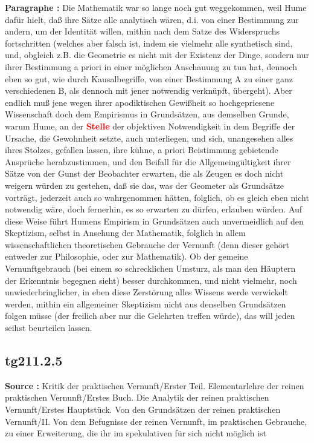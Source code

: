 \documentclass[a4paper,12pt,twoside]{book}
\newcommand{\match}[1]{\textcolor{red}{\textbf{#1}}}
\begin{document}
	\noindent\textbf{Paragraphe : }Die Mathematik war so lange noch gut weggekommen, weil Hume dafür hielt, daß ihre Sätze alle analytisch wären, d.i. von einer Bestimmung zur andern, um der Identität willen, mithin nach dem Satze des Widerspruchs fortschritten (welches aber falsch ist, indem sie vielmehr alle synthetisch sind, und, obgleich z.B. die Geometrie es nicht mit der Existenz der Dinge, sondern nur ihrer Bestimmung a priori in einer möglichen Anschauung zu tun hat, dennoch eben so gut, wie durch Kausalbegriffe, von einer Bestimmung A zu einer ganz verschiedenen B, als dennoch mit jener notwendig verknüpft, übergeht). Aber endlich muß jene wegen ihrer apodiktischen Gewißheit so hochgepriesene Wissenschaft doch dem Empirismus in Grundsätzen, aus demselben Grunde, warum Hume, an der \match{Stelle} der objektiven Notwendigkeit in dem Begriffe der Ursache, die Gewohnheit setzte, auch unterliegen, und sich, unangesehen alles ihres Stolzes, gefallen lassen, ihre kühne, a priori Beistimmung gebietende Ansprüche herabzustimmen, und den Beifall für die Allgemeingültigkeit ihrer Sätze von der Gunst der Beobachter erwarten, die als Zeugen es doch nicht weigern würden zu gestehen, daß sie das, was der Geometer als Grundsätze vorträgt, jederzeit auch so wahrgenommen hätten,  folglich, ob es gleich eben nicht notwendig wäre, doch fernerhin, es so erwarten zu dürfen, erlauben würden. Auf diese Weise führt Humens Empirism in Grundsätzen auch unvermeidlich auf den Skeptizism, selbst in Ansehung der Mathematik, folglich in allem wissenschaftlichen theoretischen Gebrauche der Vernunft (denn dieser gehört entweder zur Philosophie, oder zur Mathematik). Ob der gemeine Vernunftgebrauch (bei einem so schrecklichen Umsturz, als man den Häuptern der Erkenntnis begegnen sieht) besser durchkommen, und nicht vielmehr, noch unwiederbringlicher, in eben diese Zerstörung alles Wissens werde verwickelt werden, mithin ein allgemeiner Skeptizism nicht aus denselben Grundsätzen folgen müsse (der freilich aber nur die Gelehrten treffen würde), das will jeden seihst beurteilen lassen. 
	
	\subsection*{tg211.2.5} 
	\textbf{Source : }Kritik der praktischen Vernunft/Erster Teil. Elementarlehre der reinen praktischen Vernunft/Erstes Buch. Die Analytik der reinen praktischen Vernunft/Erstes Hauptstück. Von den Grundsätzen der reinen praktischen Vernunft/II. Von dem Befugnisse der reinen Vernunft, im praktischen Gebrauche, zu einer Erweiterung, die ihr im spekulativen für sich nicht möglich ist\\  
	
\end{document}
